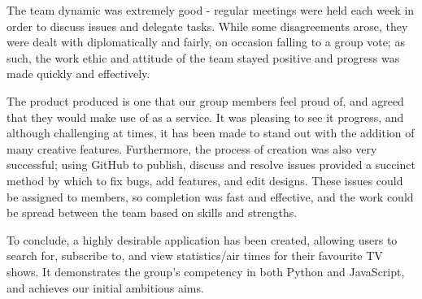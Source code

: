 \documentclass[12pt, a4paper]{article}
\begin{document}
The team dynamic was extremely good - regular meetings were held each week in order to discuss issues and delegate tasks. While some disagreements arose, they were dealt with diplomatically and fairly, on occasion falling to a group vote; as such, the work ethic and attitude of the team stayed positive and progress was made quickly and effectively.

The product produced is one that our group members feel proud of, and agreed that they would make use of as a service. It was pleasing to see it progress, and although challenging at times, it has been made to stand out with the addition of many creative features. Furthermore, the process of creation was also very successful; using GitHub to publish, discuss and resolve issues provided a succinct method by which to fix bugs, add features, and edit designs. These issues could be assigned to members, so completion was fast and effective, and the work could be spread between the team based on skills and strengths.

To conclude, a highly desirable application has been created, allowing users to search for, subscribe to, and view statistics/air times for their favourite TV shows. It demonstrates the group's competency in both Python and JavaScript, and achieves our initial ambitious aims.
\end{document}

